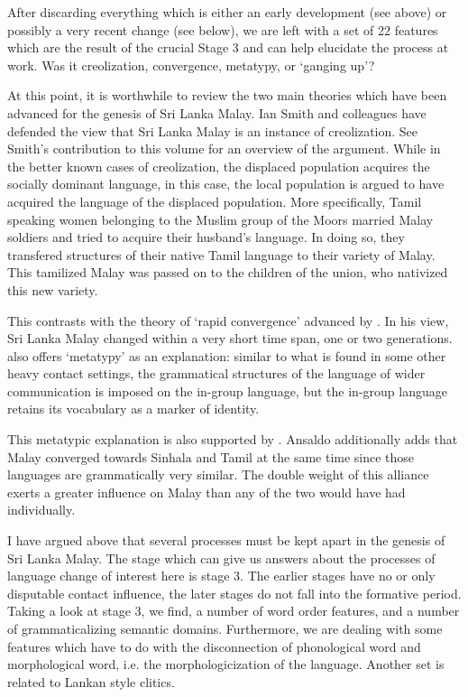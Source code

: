 After discarding everything which is either an early development (see above) or possibly a very recent change (see below), we are left with a set of 22 features which are the result of the crucial Stage 3 and can help elucidate the process at work. Was it creolization, convergence, metatypy, or `ganging up'?

At this point, it is worthwhile to review the two main theories which have been advanced for the genesis of Sri Lanka Malay. Ian Smith and colleagues have defended the view that Sri Lanka Malay is an instance of creolization. See Smith's contribution to this volume for an overview of the argument. While in the better known cases of creolization, the displaced population acquires the socially dominant language, in this case, the local population is argued to have acquired the language of the displaced population. More specifically, Tamil speaking women belonging to the Muslim group of the Moors married Malay soldiers and tried to acquire their husband's language. In doing so, they transfered structures of their native Tamil language to their variety of Malay. This tamilized Malay was passed on to the children of the union, who nativized this new variety.

This contrasts with the theory of `rapid convergence' advanced by \citet{Bakker1995nl,Bakker2000convergence, Bakker2000rapid,Bakker2006}. In his view, Sri Lanka Malay changed within a very short time span, one or two generations. \citet{Bakker2006} also offers `metatypy' as an explanation: similar to what is found in some other heavy contact settings, the grammatical structures of the language of wider communication is imposed on the in-group language, but the in-group language retains its vocabulary as a marker of identity.

This metatypic explanation is also supported by \citet{Ansaldo2008genesis,Ansaldo2009book}. Ansaldo additionally adds that Malay converged towards Sinhala and Tamil at the same time since those languages are grammatically very similar. The double weight of this alliance exerts a greater influence on Malay than any of the two would have had individually.

I have argued above that several processes must be kept apart in the genesis of Sri Lanka Malay. The stage which can give us answers about the processes of language change of interest here is stage 3. The earlier stages have no or only disputable contact influence, the later stages do not fall into the formative period. Taking a look at stage 3, we find, a number of word order features, and a number of grammaticalizing semantic domains.  Furthermore, we are dealing with some features which have to do with the disconnection of phonological word and morphological word, i.e. the morphologicization of the language. Another set is related to Lankan style clitics.

